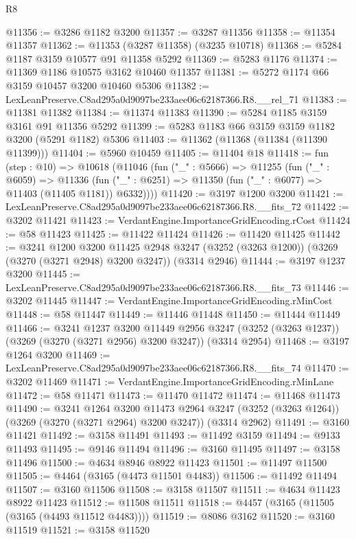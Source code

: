 \begin{lexlean}{R8}
\begin{coremodule}
@11356 := @3286 @1182 @3200
@11357 := @3287 @11356
@11358 := @11354 @11357
@11362 := @11353 (@3287 @11358) (@3235 @10718)
@11368 := @5284 @1187 @3159 @10577 @91 @11358 @5292
@11369 := @5283 @1176
@11374 := @11369 @1186 @10575 @3162 @10460 @11357
@11381 := @5272 @1174 @66 @3159 @10457 @3200 @10460 @5306
@11382 := LexLeanPreserve.C8ad295a0d9097be233aee06c62187366.R8.__rel_71
@11383 := @11381 @11382
@11384 := @11374 @11383
@11390 := @5284 @1185 @3159 @3161 @91 @11356 @5292
@11399 := @5283 @1183 @66 @3159 @3159 @1182 @3200 (@5291 @1182) @5306
@11403 := @11362 (@11368 (@11384 (@11390 @11399)))
@11404 := @5960 @10459
@11405 := @11404 @18
@11418 := fun (step : @10) =>
  @10618
    (@11046
      (fun ("_" : @5666) =>
      @11255
        (fun ("_" : @6059) =>
        @11336 (fun ("_" : @6251) => @11350 (fun ("_" : @6077) => @11403 (@11405 @1181)) @6332))))
@11420 := @3197 @1200 @3200
@11421 := LexLeanPreserve.C8ad295a0d9097be233aee06c62187366.R8.__fits_72
@11422 := @3202 @11421
@11423 := VerdantEngine.ImportanceGridEncoding.rCost
@11424 := @58 @11423
@11425 := @11422 @11424
@11426 := @11420 @11425
@11442 := @3241
    @1200
    @3200
    @11425
    @2948
    @3247
    (@3252 (@3263 @1200))
    (@3269 (@3270 (@3271 @2948) @3200 @3247))
    (@3314 @2946)
@11444 := @3197 @1237 @3200
@11445 := LexLeanPreserve.C8ad295a0d9097be233aee06c62187366.R8.__fits_73
@11446 := @3202 @11445
@11447 := VerdantEngine.ImportanceGridEncoding.rMinCost
@11448 := @58 @11447
@11449 := @11446 @11448
@11450 := @11444 @11449
@11466 := @3241
    @1237
    @3200
    @11449
    @2956
    @3247
    (@3252 (@3263 @1237))
    (@3269 (@3270 (@3271 @2956) @3200 @3247))
    (@3314 @2954)
@11468 := @3197 @1264 @3200
@11469 := LexLeanPreserve.C8ad295a0d9097be233aee06c62187366.R8.__fits_74
@11470 := @3202 @11469
@11471 := VerdantEngine.ImportanceGridEncoding.rMinLane
@11472 := @58 @11471
@11473 := @11470 @11472
@11474 := @11468 @11473
@11490 := @3241
    @1264
    @3200
    @11473
    @2964
    @3247
    (@3252 (@3263 @1264))
    (@3269 (@3270 (@3271 @2964) @3200 @3247))
    (@3314 @2962)
@11491 := @3160 @11421
@11492 := @3158 @11491
@11493 := @11492 @3159
@11494 := @9133 @11493
@11495 := @9146 @11494
@11496 := @3160 @11495
@11497 := @3158 @11496
@11500 := @4634 @8946 @8922 @11423
@11501 := @11497 @11500
@11505 := @4464 (@3165 (@4473 @11501 @4483))
@11506 := @11492 @11494
@11507 := @3160 @11506
@11508 := @3158 @11507
@11511 := @4634 @11423 @8922 @11423
@11512 := @11508 @11511
@11518 := @4457 (@3165 (@11505 (@3165 (@4493 @11512 @4483))))
@11519 := @8086 @3162
@11520 := @3160 @11519
@11521 := @3158 @11520

\end{coremodule}
\end{lexlean}
